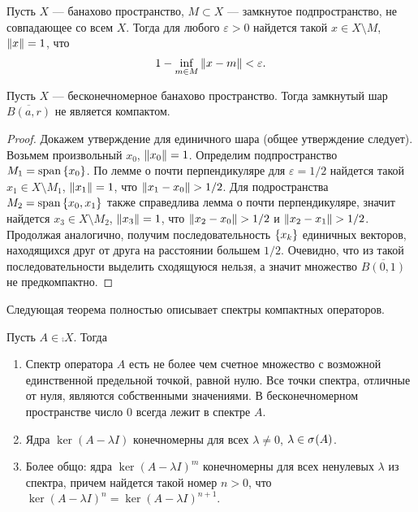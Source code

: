 \begin{lemma}
    Пусть $X$ --- банахово пространство, $M \subset X$ --- замкнутое подпространство,
    не совпадающее со всем $X$. Тогда
    для любого $\varepsilon > 0$ найдется такой $x \in X \setminus M$, $\left\|x\right\| = 1$, что
    \[ 1 - \inf_{m\in M} \left\|x - m\right\| < \varepsilon. \]
\end{lemma}

\begin{theorem}[Рисса]
    Пусть $X$ --- бесконечномерное банахово пространство. Тогда замкнутый шар 
    $\overline{B(a, r)}$ не является компактом.
\end{theorem}

\begin{proof}
    Докажем утверждение для единичного шара (общее утверждение следует). Возьмем произвольный
    $x_0$, $\left\|x_0\right\| = 1$. Определим подпространство $M_1 = \operatorname{span}\left\{x_0\right\}$. 
    По лемме о почти перпендикуляре для $\varepsilon = 1/2$ найдется такой 
    $x_1 \in X \setminus M_1$, $\left\|x_1\right\| = 1$, что
    $\left\|x_1 - x_0\right\| > 1/2$. Для подространства $M_2 = \operatorname{span}\left\{x_0, x_1\right\}$ также 
    справедлива лемма о почти перпендикуляре, значит найдется $x_3 \in X \setminus M_2$, 
    $\left\|x_3\right\| = 1$, что $\left\|x_2 - x_0\right\| > 1/2$ и $\left\|x_2 - x_1\right\| > 1/2$. Продолжая аналогично, получим
    последовательность $\left\{x_k\right\}$ единичных векторов, находящихся друг от друга на расстоянии 
    большем $1/2$.
    Очевидно, что из такой последовательности выделить сходящуюся нельзя, а значит множество 
    $\overline{B(0, 1)}$ не предкомпактно.
\end{proof}

Следующая теорема полностью описывает спектры компактных операторов.

\begin{theorem}
    Пусть $A \in \comp{X}$. Тогда
    \begin{enumerate}
        \item Спектр оператора $A$ есть не более чем счетное множество с возможной единственной
        предельной точкой, равной нулю. Все точки спектра, отличные от нуля, являются собственными
        значениями. В бесконечномерном пространстве число $0$ всегда лежит в спектре $A$.
        \item Ядра $\ker(A- \lambda I)$ конечномерны для всех $\lambda \neq 0$, 
        $\lambda \in \spectrum{A}$.
        \item Более общо: ядра $\ker (A - \lambda I)^m$ конечномерны для всех ненулевых $\lambda$
        из спектра, причем найдется такой номер $n > 0$, что 
        $\ker (A - \lambda I)^n = \ker (A - \lambda I)^{n+1}$.
    \end{enumerate}
\end{theorem}


